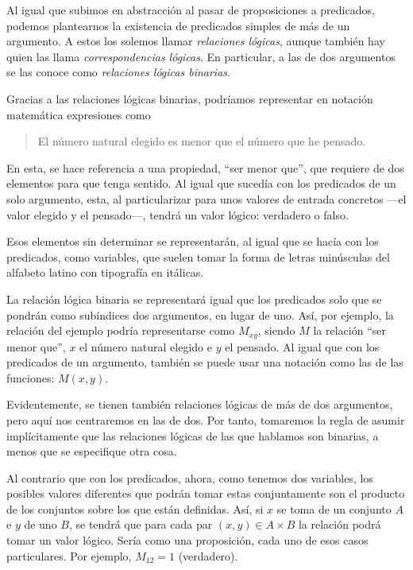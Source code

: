 



Al igual que subimos en abstracción al pasar de proposiciones a predicados,
podemos plantearnos la existencia de predicados simples de más de un
argumento. A estos los solemos llamar \emph{relaciones lógicas}, aunque
también hay quien las llama \emph{correspondencias lógicas}. En particular,
a las de dos argumentos se las conoce como \emph{relaciones lógicas
binarias}.

Gracias a las relaciones lógicas binarias, podríamos representar en notación
matemática expresiones como

\begin{quote}
  El número natural elegido es menor que el número que he pensado.
\end{quote}

\noindent En esta, se hace referencia a una propiedad, ``ser menor que'',
que requiere de dos elementos para que tenga sentido. Al igual que sucedía
con los predicados de un solo argumento, esta, al particularizar para unos
valores de entrada concretos ---el valor elegido y el pensado---, tendrá un
valor lógico: verdadero o falso.

Esos elementos sin determinar se representarán, al igual que se hacía con
los predicados, como variables, que suelen tomar la forma de letras
minúsculas del alfabeto latino con tipografía en itálicas.

La relación lógica binaria se representará igual que los predicados solo que
se pondrán como subíndices dos argumentos, en lugar de uno. Así, por
ejemplo, la relación del ejemplo podría representarse como $M_{xy}$, siendo
$M$ la relación ``ser menor que'', $x$ el número natural elegido e $y$ el
pensado. Al igual que con los predicados de un argumento, también se puede
usar una notación como las de las funciones: $M(x, y)$.

Evidentemente, se tienen también relaciones lógicas de más de dos
argumentos, pero aquí nos centraremos en las de dos. Por tanto, tomaremos la
regla de asumir implícitamente que las relaciones lógicas de las que
hablamos son binarias, a menos que se especifique otra cosa.

Al contrario que con los predicados, ahora, como tenemos dos variables, los
posibles valores diferentes que podrán tomar estas conjuntamente son el
producto de los conjuntos sobre los que están definidas. Así, si $x$ se toma
de un conjunto $A$ e $y$ de uno $B$, se tendrá que para cada par $(x, y) \in
A \times B$ la relación podrá tomar un valor lógico. Sería como una
proposición, cada uno de esos casos particulares. Por ejemplo, $M_{12}= 1$
(verdadero).

